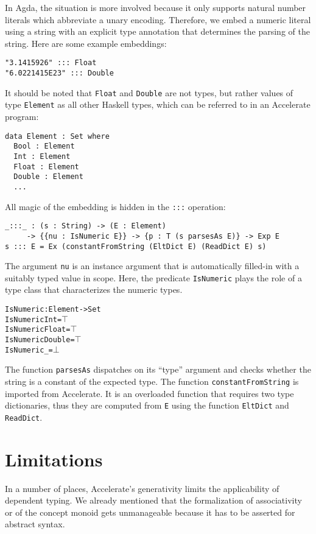\documentclass{llncs}
\begin{document}
In Agda, the situation is more involved because it only supports
natural number literals which abbreviate a unary encoding. Therefore,
we embed a numeric literal using a string with an explicit
type annotation that determines the parsing of the string. Here are
some example embeddings:
\begin{verbatim}
"3.1415926" ::: Float
"6.0221415E23" ::: Double
\end{verbatim}
It should be noted that \texttt{Float} and \texttt{Double} are not
types, but rather values of type \texttt{Element} as all other Haskell
types, which can be referred to in an Accelerate program:
\begin{verbatim}
data Element : Set where
  Bool : Element
  Int : Element
  Float : Element
  Double : Element
  ...
\end{verbatim}
All magic of the embedding is hidden in the \texttt{:::} operation:
\begin{verbatim}
_:::_ : (s : String) -> (E : Element) 
     -> {{nu : IsNumeric E}} -> {p : T (s parsesAs E)} -> Exp E
s ::: E = Ex (constantFromString (EltDict E) (ReadDict E) s)
\end{verbatim}
The argument \texttt{nu} is an instance argument that is automatically
filled-in with a suitably typed value in scope. Here, the predicate
\texttt{IsNumeric} plays the role of a type class that characterizes
the numeric types.
\begin{alltt}
IsNumeric : Element -> Set
IsNumeric Int = \(\top\)
IsNumeric Float = \(\top\)
IsNumeric Double = \(\top\)
IsNumeric _ = \(\bot\)
\end{alltt}
The function \texttt{parsesAs} dispatches on its ``type'' argument and
checks whether the string is a constant of the expected type. The
function \texttt{constantFromString} is imported from Accelerate.
It is an overloaded function that requires two type dictionaries, thus
they are computed from \texttt{E} using the function \texttt{EltDict}
and \texttt{ReadDict}. 

\section{Limitations}
\label{sec:limitations}

In a number of places, Accelerate's generativity limits the
applicability of dependent typing. We already mentioned that the
formalization of associativity or of the concept monoid gets
unmanageable because it has to be asserted for abstract syntax.
\end{document}
